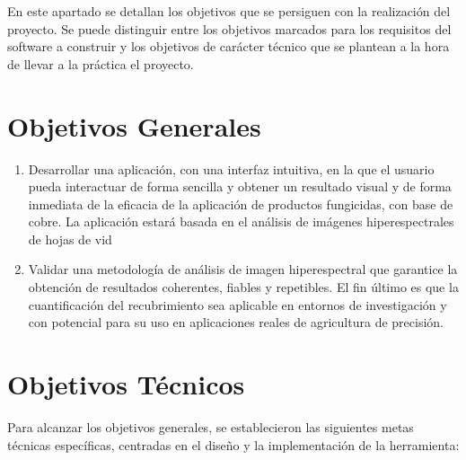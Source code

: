 
En este apartado se detallan los objetivos que se persiguen con la realización del proyecto. Se puede distinguir entre los objetivos marcados para los requisitos del software a construir y los objetivos de carácter técnico que se plantean a la hora de llevar a la práctica el proyecto.

\section {Objetivos Generales}
\begin{enumerate}

\item Desarrollar una aplicación, con una interfaz intuitiva, en la que el usuario pueda interactuar de forma sencilla y obtener un resultado visual y de forma inmediata de la eficacia de la aplicación de productos fungicidas, con base de cobre. La aplicación estará basada en el análisis de imágenes hiperespectrales de hojas de vid   

\item Validar una metodología de análisis de imagen hiperespectral que garantice la obtención de resultados coherentes, fiables y repetibles. El fin último es que la cuantificación del recubrimiento sea aplicable en entornos de investigación y con potencial para su uso en aplicaciones reales de agricultura de precisión. 

\end{enumerate}

\section {Objetivos Técnicos} 
Para alcanzar los objetivos generales, se establecieron las siguientes metas técnicas específicas, centradas en el diseño y la implementación de la herramienta:

